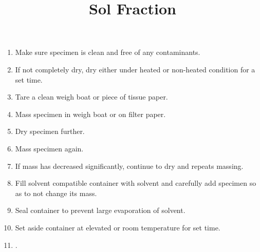 \documentclass[11pt, oneside]{article}   	%
\title{Sol Fraction}
\begin{document}
\maketitle 							%
\date{}							%

\begin{enumerate}

\item Make sure specimen is clean and free of any contaminants.
\item If not completely dry, dry either under heated or non-heated condition for a set time.
\item Tare a clean weigh boat or piece of tissue paper.
\item Mass specimen in weigh boat or on filter paper.
\item Dry specimen further.
\item Mass specimen again.
\item If mass has decreased significantly, continue to dry and repeats massing.
\item Fill solvent compatible container with solvent and carefully add specimen so as to not change its mass.
\item Seal container to prevent large evaporation of solvent.
\item Set aside container at elevated or room temperature for set time.
\item .

\end{enumerate}
\end{document}
